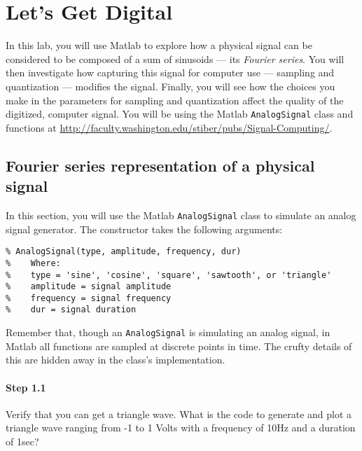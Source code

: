 
\section{Let's Get Digital}

In this lab, you will use Matlab to explore how a physical signal can
be considered to be composed of a sum of sinusoids --- its
\emph{Fourier series}. You will then investigate how capturing this
signal for computer use --- sampling and quantization --- modifies the
signal. Finally, you will see how the choices you make in the
parameters for sampling and quantization affect the quality of the
digitized, computer signal. You will be using the Matlab
\texttt{AnalogSignal} class and functions at
\url{http://faculty.washington.edu/stiber/pubs/Signal-Computing/}.

\subsection{Fourier series representation of a physical signal}

In this section, you will use the Matlab \texttt{AnalogSignal} class
to simulate an analog signal generator. The constructor takes the
following arguments:
\begin{verbatim}
% AnalogSignal(type, amplitude, frequency, dur)
%    Where:
%    type = 'sine', 'cosine', 'square', 'sawtooth', or 'triangle'
%    amplitude = signal amplitude
%    frequency = signal frequency
%    dur = signal duration
\end{verbatim}

Remember that, though an \texttt{AnalogSignal} is simulating an analog
signal, in Matlab all functions are sampled at discrete points in
time. The crufty details of this are hidden away in the class's
implementation.

\paragraph{Step 1.1} Verify that you can get a triangle wave. What is
the code to generate and plot a triangle wave ranging from -1 to 1
Volts with a frequency of 10Hz and a duration of 1sec?

